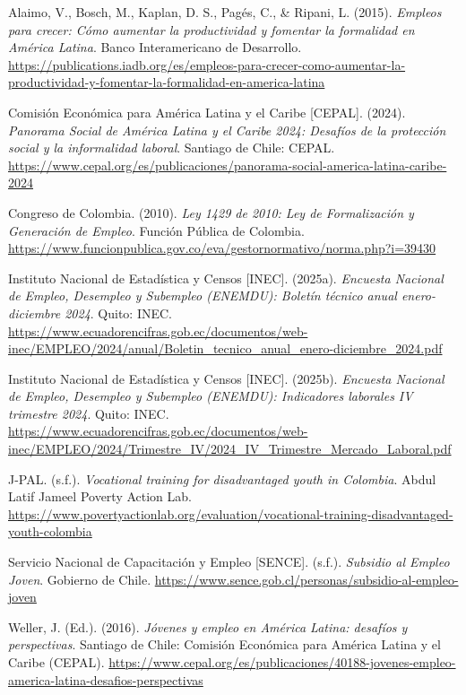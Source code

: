 \documentclass[10pt,]{article}
\begin{document}
\begin{referenciasAPA}
Alaimo, V., Bosch, M., Kaplan, D. S., Pagés, C., \& Ripani, L. (2015). \textit{Empleos para crecer: Cómo aumentar la productividad y fomentar la formalidad en América Latina}. Banco Interamericano de Desarrollo. \url{https://publications.iadb.org/es/empleos-para-crecer-como-aumentar-la-productividad-y-fomentar-la-formalidad-en-america-latina}

Comisión Económica para América Latina y el Caribe [CEPAL]. (2024). \textit{Panorama Social de América Latina y el Caribe 2024: Desafíos de la protección social y la informalidad laboral}. Santiago de Chile: CEPAL. \url{https://www.cepal.org/es/publicaciones/panorama-social-america-latina-caribe-2024}

Congreso de Colombia. (2010). \textit{Ley 1429 de 2010: Ley de Formalización y Generación de Empleo}. Función Pública de Colombia. \url{https://www.funcionpublica.gov.co/eva/gestornormativo/norma.php?i=39430}

Instituto Nacional de Estadística y Censos [INEC]. (2025a). \textit{Encuesta Nacional de Empleo, Desempleo y Subempleo (ENEMDU): Boletín técnico anual enero-diciembre 2024}. Quito: INEC. \url{https://www.ecuadorencifras.gob.ec/documentos/web-inec/EMPLEO/2024/anual/Boletin_tecnico_anual_enero-diciembre_2024.pdf}

Instituto Nacional de Estadística y Censos [INEC]. (2025b). \textit{Encuesta Nacional de Empleo, Desempleo y Subempleo (ENEMDU): Indicadores laborales IV trimestre 2024}. Quito: INEC. \url{https://www.ecuadorencifras.gob.ec/documentos/web-inec/EMPLEO/2024/Trimestre_IV/2024_IV_Trimestre_Mercado_Laboral.pdf}

J-PAL. (s.f.). \textit{Vocational training for disadvantaged youth in Colombia}. Abdul Latif Jameel Poverty Action Lab. \url{https://www.povertyactionlab.org/evaluation/vocational-training-disadvantaged-youth-colombia}

Servicio Nacional de Capacitación y Empleo [SENCE]. (s.f.). \textit{Subsidio al Empleo Joven}. Gobierno de Chile. \url{https://www.sence.gob.cl/personas/subsidio-al-empleo-joven}

Weller, J. (Ed.). (2016). \textit{Jóvenes y empleo en América Latina: desafíos y perspectivas}. Santiago de Chile: Comisión Económica para América Latina y el Caribe (CEPAL). \url{https://www.cepal.org/es/publicaciones/40188-jovenes-empleo-america-latina-desafios-perspectivas}
\end{referenciasAPA}
\end{document}
